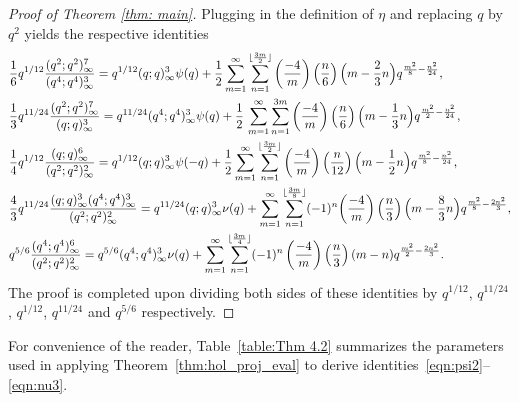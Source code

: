 \documentclass[11pt,reqno]{amsart}
\renewcommand{\=}{\;=\;}
\theoremstyle{myremark}
\begin{document}
\begin{proof}[Proof of Theorem \ref{thm: main}]
Plugging in the definition of $\eta$ and replacing $q$ by $q^2$ yields the respective identities
\begin{equation*}
\begin{aligned}
&
\frac{1}{6}q^{1/12}\frac{(q^2;q^2)^7_\infty}{(q^4;q^4)^3_\infty} = q^{1/12} (q;q)^3_\infty\psi(q) + \frac{1}{2}\sum_{m=1}^\infty \sum_{n=1}^{\lfloor {3m \over 2}\rfloor} \left({-4 \over m}\right) \left({n \over 6}\right) \Big( m-{2 \over 3}n \Big) q^{{m^2 \over 8}-{n^2 \over 24}},\\
&
\frac{1}{3}q^{11/24}\frac{(q^2;q^2)^7_\infty}{(q;q)^3_\infty} = q^{11/24}(q^4;q^4)_\infty^3\psi(q) + \frac{1}{2}\,\sum_{m=1}^\infty \sum_{n=1}^{3m} \left({-4 \over m}\right) \left({n \over 6}\right) \Big(m - {1 \over 3}n \Big) q^{{m^2 \over 2} - {n^2 \over 24}},\\
&
\frac{1}{4}q^{1/12}\frac{(q;q)^6_\infty}{(q^2;q^2)^2_\infty} = q^{1/12}(q;q)^3_\infty\psi(-q) + \frac{1}{2}\sum_{m=1}^\infty \sum_{n=1}^{\lfloor {3m \over 2}\rfloor} \left({-4 \over m}\right) \left({n \over 12}\right) \Big( m-{1 \over 2}n \Big) q^{{m^2 \over 8}-{n^2 \over 24}},\\
&
\frac{4}{3}q^{11/24}\frac{(q;q)^3_\infty(q^4;q^4)^3_\infty}{(q^2;q^2)^2_\infty} = q^{11/24}(q;q)^3_\infty\nu(q) + \sum_{m=1}^\infty \sum_{n=1}^{\lfloor {3m \over 8}\rfloor} (-1)^n\! \left({-4 \over m}\right) \left({n \over 3}\right) \Big( m-{8 \over 3}n \Big) q^{{m^2 \over 8}-{2n^2 \over 3}},\\
&
q^{5/6}\frac{(q^4;q^4)^6_\infty}{(q^2;q^2)^2_\infty} = q^{5/6}(q^4;q^4)^3_\infty\nu(q) + \sum_{m=1}^\infty \sum_{n=1}^{\lfloor {3m \over 4}\rfloor} (-1)^n \left({-4 \over m}\right) \left({n \over 3}\right) (m-n)q^{{m^2 \over 2}-{2n^2 \over 3}}.
\end{aligned}
\end{equation*}
The proof is completed upon dividing both sides of these identities by
$q^{1/12}$, $q^{11/24}$, $q^{1/12}$, $q^{11/24}$ and $q^{5/6}$ respectively.
\end{proof}

For convenience of the reader, Table~\ref{table:Thm 4.2} summarizes the parameters used in applying Theorem~\ref{thm:hol_proj_eval} to derive identities~\eqref{eqn:psi2}--\eqref{eqn:nu3}.
\end{document}
